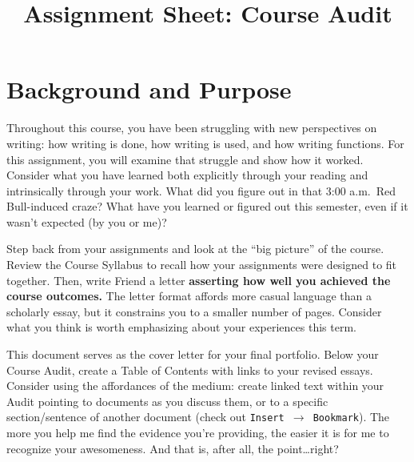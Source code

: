 \documentclass[9pt,twocolumn,oneside]{amsart}	%
\title[Course Audit]{Assignment Sheet: Course Audit}
\begin{document}
%
\thispagestyle{empty}
\setlength{\columnsep}{.25in}


\section{Background and Purpose} %
\label{sec:background}
Throughout this course, you have been struggling with new perspectives on writing: how writing is done, how writing is used, and how writing functions. For this assignment, you will examine that struggle and show how it worked. Consider what you have learned both explicitly through your reading and intrinsically through your work. What did you figure out in that 3:00 a.m.\ Red Bull\textregistered{}-induced craze? What have you learned or figured out this semester, even if it wasn't expected (by you or me)?

Step back from your assignments and look at the ``big picture'' of the course. Review the Course Syllabus to recall how your assignments were designed to fit together. Then, write Friend a letter \textbf{asserting how well you achieved the course outcomes.} The letter format affords more casual language than a scholarly essay, but it constrains you to a smaller number of pages. Consider what you think is worth emphasizing about your experiences this term.%

This document serves as the cover letter for your final portfolio. Below your Course Audit, create a Table of Contents with links to your revised essays. Consider using the affordances of the medium: create linked text within your Audit pointing to documents as you discuss them, or to a specific section/sentence of another document (check out \texttt{Insert\ $\rightarrow$\ Bookmark}). The more you help me find the evidence you're providing, the easier it is for me to recognize your awesomeness. And that is, after all, the point\ldots{}right?
\end{document}
